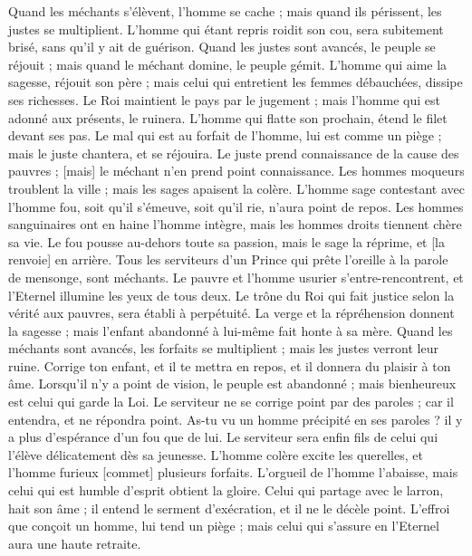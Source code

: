 \begin{multicols}{2}
Quand les méchants s'élèvent, l'homme se cache ; mais quand ils périssent, les justes se multiplient.
\VerseOne{}L'homme qui étant repris roidit son cou, sera subitement brisé, sans qu'il y ait de guérison.
Quand les justes sont avancés, le peuple se réjouit ; mais quand le méchant domine, le peuple gémit.
L'homme qui aime la sagesse, réjouit son père ; mais celui qui entretient les femmes débauchées, dissipe ses richesses.
Le Roi maintient le pays par le jugement ; mais l'homme qui est adonné aux présents, le ruinera.
L'homme qui flatte son prochain, étend le filet devant ses pas.
Le mal qui est au forfait de l'homme, lui est comme un piège ; mais le juste chantera, et se réjouira.
Le juste prend connaissance de la cause des pauvres ; [mais] le méchant n'en prend point connaissance.
Les hommes moqueurs troublent la ville ; mais les sages apaisent la colère.
L'homme sage contestant avec l'homme fou, soit qu'il s'émeuve, soit qu'il rie, n'aura point de repos.
Les hommes sanguinaires ont en haine l'homme intègre, mais les hommes droits tiennent chère sa vie.
Le fou pousse au-dehors toute sa passion, mais le sage la réprime, et [la renvoie] en arrière.
Tous les serviteurs d'un Prince qui prête l'oreille à la parole de mensonge, sont méchants.
Le pauvre et l'homme usurier s'entre-rencontrent, et l'Eternel illumine les yeux de tous deux.
Le trône du Roi qui fait justice selon la vérité aux pauvres, sera établi à perpétuité.
La verge et la répréhension donnent la sagesse ; mais l'enfant abandonné à lui-même fait honte à sa mère.
Quand les méchants sont avancés, les forfaits se multiplient ; mais les justes verront leur ruine.
Corrige ton enfant, et il te mettra en repos, et il donnera du plaisir à ton âme.
Lorsqu'il n'y a point de vision, le peuple est abandonné ; mais bienheureux est celui qui garde la Loi.
Le serviteur ne se corrige point par des paroles ; car il entendra, et ne répondra point.
As-tu vu un homme précipité en ses paroles ? il y a plus d'espérance d'un fou que de lui.
Le serviteur sera enfin fils de celui qui l'élève délicatement dès sa jeunesse.
L'homme colère excite les querelles, et l'homme furieux [commet] plusieurs forfaits.
L'orgueil de l'homme l'abaisse, mais celui qui est humble d'esprit obtient la gloire.
Celui qui partage avec le larron, hait son âme ; il entend le serment d'exécration, et il ne le décèle point.
L'effroi que conçoit un homme, lui tend un piège ; mais celui qui s'assure en l'Eternel aura une haute retraite.

\end{multicols}
